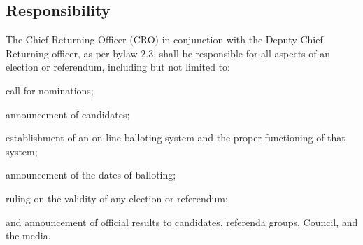 \subsection{Responsibility}
\begin{longenum}[ label*=\thesubsection.\arabic*., align=left]
	\item The Chief Returning Officer (CRO) in conjunction with the Deputy Chief Returning  officer, as per bylaw 2.3, shall be responsible for all aspects of an election or referendum, including but not limited to:
    \begin{longenum}[ label*=\arabic*., align=left]
		\item call for nominations; 
        \item announcement of candidates;
        \item establishment of an on-line balloting system and the proper functioning of that system; 
        \item announcement of the dates of balloting; 
        \item ruling on the validity of any election or referendum;
        \item and announcement of official results to candidates, referenda groups, Council, and the media. 
	\end{longenum}
    
\end{longenum}

